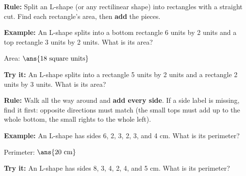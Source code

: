 \documentclass[12pt]{article}
\begin{document}
\begin{formulabox}
\textbf{Rule:} Split an L-shape (or any rectilinear shape) into rectangles
with a straight cut. Find each rectangle's area, then \textbf{add} the pieces.
\end{formulabox}

\begin{examplebox}
\textbf{Example:} An L-shape splits into a bottom rectangle 6 units by
2 units and a top rectangle 3 units by 2 units. What is its area?

Area: $\ans{18\ \text{square units}}$
\end{examplebox}

\begin{tryitbox}
\textbf{Try it:} An L-shape splits into a rectangle 5 units by 2 units and a
rectangle 2 units by 3 units. What is its area?\\[2pt]
\end{tryitbox}


\begin{formulabox}
\textbf{Rule:} Walk all the way around and \textbf{add every side}. If a side
label is missing, find it first: opposite directions must match (the small
tops must add up to the whole bottom, the small rights to the whole left).
\end{formulabox}

\begin{examplebox}
\textbf{Example:} An L-shape has sides 6, 2, 3, 2, 3, and 4 cm. What is its
perimeter?

Perimeter: $\ans{20\ \text{cm}}$
\end{examplebox}

\begin{tryitbox}
\textbf{Try it:} An L-shape has sides 8, 3, 4, 2, 4, and 5 cm. What is its
perimeter?\\[2pt]
\end{tryitbox}
\end{document}
